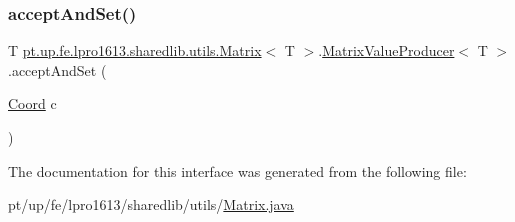 \subsubsection{\texorpdfstring{accept\+And\+Set()}{acceptAndSet()}}
{\footnotesize\ttfamily T \hyperlink{classpt_1_1up_1_1fe_1_1lpro1613_1_1sharedlib_1_1utils_1_1_matrix}{pt.\+up.\+fe.\+lpro1613.\+sharedlib.\+utils.\+Matrix}$<$ T $>$.\hyperlink{interfacept_1_1up_1_1fe_1_1lpro1613_1_1sharedlib_1_1utils_1_1_matrix_1_1_matrix_value_producer}{Matrix\+Value\+Producer}$<$ T $>$.accept\+And\+Set (\begin{DoxyParamCaption}\item[{\hyperlink{classpt_1_1up_1_1fe_1_1lpro1613_1_1sharedlib_1_1utils_1_1_coord}{Coord}}]{c }\end{DoxyParamCaption})}



The documentation for this interface was generated from the following file\+:\begin{DoxyCompactItemize}
\item 
pt/up/fe/lpro1613/sharedlib/utils/\hyperlink{_matrix_8java}{Matrix.\+java}\end{DoxyCompactItemize}

